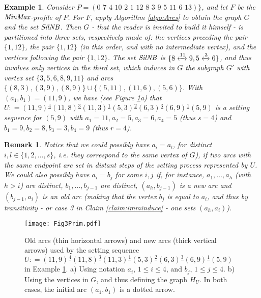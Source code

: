 \documentclass{article}
\newcommand{\M}{\mbox{\it MinMax}}
\newcommand{\lrf}[1]{\xleftrightarrow{#1}}
\newcommand{\Sil}{{\it SilNB}}
\newtheorem{rmk}{Remark}
\newtheorem{ex}{Example}
\newcommand{\br}{\begin{rmk}\rm}
\newcommand{\er}{\end{rmk}}
\newcommand{\bex}{\begin{ex}\rm}
\newcommand{\eex}{\end{ex}}
\begin{document}
\bex
Consider $P=(0\,\, 7\,\, 4\,\, 10\,\, 2\,\, 1\,\, 12\,\, 8\,\, 3\,\, 9\,\, 5\,\, 11\,\, 6\,\, 13)\}$,
and let $F$ be the $\M$-profile of $P$. For $F$, apply Algorithm \ref{algo:Arcs} to obtain the
graph $G$ and the set $\Sil$.  Then $G$ - that the reader is invited to build it himself - is partitioned into three sets, respectively made of:
the vertices preceding the pair $\{1,12\}$, the pair $\{1,12\}$ (in this order, and with no intermediate vertex),
and the  vertices following the pair $\{1,12\}$. The set $\Sil$ is $\{8\lrf{11}9, 5\lrf{3}6\}$, and thus
involves only vertices in the third set, which induces in
$G$ the subgraph $G'$ with vertex set $\{3, 5, 6, 8, 9, 11\}$ and arcs
$\{(8,3), (3,9), (8,9)\}\cup\{(5,11), (11,6), (5,6)\}$.
With $(a_1,b_1)=(11,9)$, 
we have (see Figure \ref{fig:ex3}a) that $U: =(11,9)\frac{4}{} (11,8)\frac{3}{} (11,3)\frac{1}{} (5,3)\frac{2}{} (6,3)\frac{3}{} (6,9)\frac{1}{} (5,9)$ is a setting sequence
for $(5,9)$ with $a_1=11, a_2=5, a_3=6, a_4=5$ (thus $s=4$) and $b_1=9, b_2=8, b_3=3, b_4=9$ (thus $r=4$).
\label{ex:HU}
\eex

\br
Notice that we could possibly have $a_i=a_l$, for distinct $i,l\in\{1, 2, \ldots, s\}$, {\em i.e.} they
correspond to the same vertex of $G$), if two
arcs with the same endpoint are set in distant steps of the setting process represented by $U$. We could also
possibly have $a_i=b_j$  for some $i,j$ if, for instance, $a_1, \ldots, a_h$ (with $h> i$) are distinct,
$b_1, \ldots, b_{j-1}$ are  distinct, $(a_h,b_{j-1})$ is a new arc and $(b_{j-1},a_i)$ is an old arc 
(making that the vertex $b_{j}$ is equal to $a_i$, and thus by transitivity - or case 3 in Claim \ref{claim:imminduce} - 
one sets $(a_h,a_i)$).
\label{rem:several}
\er


\begin{figure}[t]
\vspace*{-1.5cm}
\begin{center}
\texttt{[image: Fig3Prim.pdf]}
\end{center}
\vspace*{-4cm}
\caption{{\small Old arcs (thin horizontal arrows) and new arcs (thick vertical arrows) used by 
the setting sequence $U: =(11,9)\frac{4}{} (11,8)\frac{3}{} (11,3)\frac{1}{} (5,3)\frac{2}{} (6,3)\frac{3}{} (6,9)\frac{1}{} (5,9)$ in Example \ref{ex:HU}. a) Using notation $a_i$, $1\leq i\leq 4$, and $b_j$, $1\leq j\leq 4$. b) Using 
the vertices in $G$, and thus defining the graph $H_{U}$. In both cases, the initial arc $(a_1,b_1)$ is
a dotted arrow.}}
\label{fig:ex3}
\end{figure}
\end{document}
